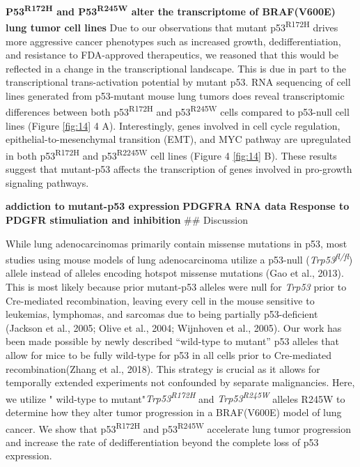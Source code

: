 \textbf{P53\textsuperscript{R172H} and P53\textsuperscript{R245W} alter the transcriptome of BRAF(V600E) lung tumor cell lines}
Due to our observations that mutant p53\textsuperscript{R172H} drives more aggressive cancer phenotypes such as increased growth, dedifferentiation, and resistance to FDA-approved therapeutics, we reasoned that this would be reflected in a change in the transcriptional landscape. This is due in part to the transcriptional trans-activation potential by mutant p53. RNA sequencing of cell lines generated from p53-mutant mouse lung tumors does reveal transcriptomic differences between both p53\textsuperscript{R172H} and p53\textsuperscript{R245W} cells compared to p53-null cell lines (Figure \ref{fig:14} 4 A). Interestingly, genes involved in cell cycle regulation, epithelial-to-mesenchymal transition (EMT), and MYC pathway are upregulated in both p53\textsuperscript{R172H} and p53\textsuperscript{R2245W} cell lines (Figure 4 \ref{fig:14} B). These results suggest that mutant-p53 affects the transcription of genes involved in pro-growth signaling pathways.

\textbf{addiction to mutant-p53 expression}
\textbf{PDGFRA RNA data}
\textbf{Response to PDGFR stimuliation and inhibition}
\#\# Discussion

While lung adenocarcinomas primarily contain missense mutations in p53, most studies using mouse models of lung adenocarcinoma utilize a p53-null (\emph{Trp53\textsuperscript{fl/fl}}) allele instead of alleles encoding hotspot missense mutations (Gao et al., 2013). This is most likely because prior mutant-p53 alleles were null for \emph{Trp53} prior to Cre-mediated recombination, leaving every cell in the mouse sensitive to leukemias, lymphomas, and sarcomas due to being partially p53-deficient (Jackson et al., 2005; Olive et al., 2004; Wijnhoven et al., 2005). Our work has been made possible by newly described ``wild-type to mutant'' p53 alleles that allow for mice to be fully wild-type for p53 in all cells prior to Cre-mediated recombination(Zhang et al., 2018). This strategy is crucial as it allows for temporally extended experiments not confounded by separate malignancies. Here, we utilize " wild-type to mutant"\emph{Trp53\textsuperscript{R172H}} and \emph{Trp53\textsuperscript{R245W}} alleles R245W to determine how they alter tumor progression in a BRAF(V600E) model of lung cancer. We show that p53\textsuperscript{R172H} and p53\textsuperscript{R245W} accelerate lung tumor progression and increase the rate of dedifferentiation beyond the complete loss of p53 expression.

